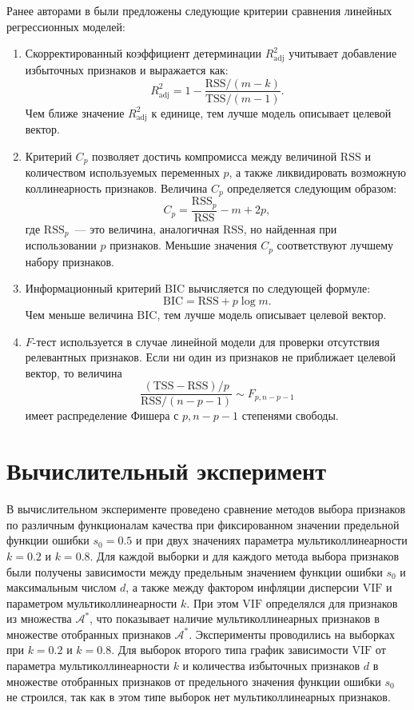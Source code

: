 \documentclass[a4paper,12pt]{article}
\newcommand{\calA}{\mathcal{A}}
\newcommand{\vif}{\mathrm{VIF}}
\newcommand{\rss}{\mathrm{RSS}}
\newcommand{\tss}{\mathrm{TSS}}
\newcommand{\bic}{\mathrm{BIC}}
\newcommand{\radj}{R_{\text{adj}}^2}
\begin{document}
Ранее авторами в \cite{multCausesEffectsRemedies,Krymova} были предложены следующие критерии сравнения линейных регрессионных моделей:
\begin{enumerate}
\item Скорректированный коэффициент детерминации $\radj$ учитывает добавление избыточных признаков и выражается как:
\[
\radj = 1 - \frac{\rss / (m - k)}{\tss / (m - 1)}.
\]
Чем ближе значение $\radj$ к единице, тем лучше модель описывает целевой вектор.
\item Критерий $C_p$ позволяет достичь компромисса между величиной $\rss$ и количеством используемых переменных $p$, а также ликвидировать возможную коллинеарность признаков. Величина $C_p$ определяется следующим образом:
\[
C_p = \frac{\rss_p}{\rss} - m + 2p,
\]
где $\rss_p$~--- это величина, аналогичная $\rss$, но найденная при использовании $p$ признаков. Меньшие значения $C_p$ соответствуют лучшему набору признаков.    
\item Информационный критерий $\bic$ вычисляется по следующей формуле:
\[
\bic = \rss + p \log m.
\]
Чем меньше величина $\bic$, тем лучше модель описывает целевой вектор.
\item $F$-тест используется в случае линейной модели для проверки отсутствия релевантных признаков. Если ни один из признаков не приближает целевой вектор, то величина 
\[
\frac{(\tss - \rss) / p}{\rss / (n - p - 1)} \sim F_{p, n - p -1}
\]
имеет распределение Фишера с $p, n-p-1$ степенями свободы. 
\end{enumerate}

\section{Вычислительный эксперимент}
В вычислительном эксперименте проведено сравнение методов выбора признаков по различным функционалам качества при фиксированном значении предельной функции ошибки $s_0 = 0.5$ и при двух значениях параметра мультиколлинеарности $k = 0.2$ и $k = 0.8$. Для каждой выборки и для каждого метода выбора признаков были получены зависимости между предельным значением функции ошибки $s_0$ и максимальным числом $d$, а также между фактором инфляции дисперсии $\vif$ и параметром мультиколлинеарности $k$. При этом $\vif$ определялся для признаков из множества $\calA^*$, что показывает наличие мультиколлинеарных признаков в множестве отобранных признаков $\calA^*$.  Эксперименты проводились на выборках при $k = 0.2$ и $k = 0.8$. Для выборок второго типа график зависимости $\vif$ от параметра мультиколлинеарности $k$ и количества избыточных признаков $d$ в множестве отобранных признаков от предельного значения функции ошибки $s_0$ не строился, так как в этом типе выборок нет мультиколлинеарных признаков. 
\end{document}
